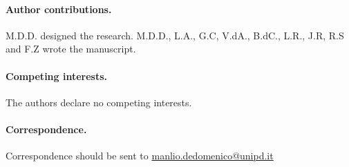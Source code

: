 \documentclass[12pt]{article}
\renewcommand{\(}{\left(}
\renewcommand{\)}{\right)}
\renewcommand{\[}{\left[}
\renewcommand{\]}{\right]}
\newcommand{\rev}[1]{{\color{red} #1}}
\begin{document}

 


\clearpage



\paragraph{Author contributions.} M.D.D. designed the research. M.D.D., L.A., G.C, V.dA., B.dC., L.R., J.R, R.S and F.Z wrote the manuscript.

\paragraph{Competing interests.} The authors declare no competing interests.

\paragraph{Correspondence.} Correspondence should be sent to \url{manlio.dedomenico@unipd.it}
\end{document}
